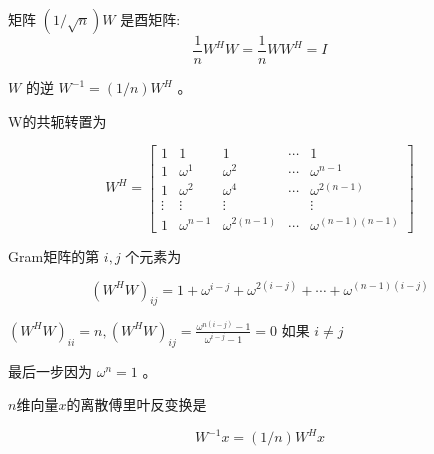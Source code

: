 \begin{corollary}
    矩阵 $ (1 / \sqrt{n}) W $ 是酉矩阵:
$$
\frac{1}{n} W^{H} W=\frac{1}{n} W W^{H}=I
$$
\end{corollary}

\begin{corollary}
    $ W $ 的逆 $ W^{-1}=(1 / n) W^{H} $ 。
\end{corollary}

\begin{corollary}
    W的共轭转置为

    $$ W^{H}=\left[\begin{array}{ccccc}1 & 1 & 1 & \cdots & 1 \\ 1 & \omega^{1} & \omega^{2} & \cdots & \omega^{n-1} \\ 1 & \omega^{2} & \omega^{4} & \cdots & \omega^{2(n-1)} \\ \vdots & \vdots & \vdots & & \vdots \\ 1 & \omega^{n-1} & \omega^{2(n-1)} & \cdots & \omega^{(n-1)(n-1)}\end{array}\right] $$
\end{corollary}

\begin{corollary}
    Gram矩阵的第 $ i, j $ 个元素为

    $$ \left(W^{H} W\right)_{i j}=1+\omega^{i-j}+\omega^{2(i-j)}+\cdots+\omega^{(n-1)(i-j)} $$
    
$ \left(W^{H} W\right)_{i i}=n, \left(W^{H} W\right)_{i j}=\frac{\omega^{n(i-j)}-1}{\omega^{i-j}-1}=0 $ 如果 $ i \neq j $

最后一步因为 $ \omega^{n}=1 $ 。
\end{corollary}

\begin{definition}[离散傅里叶反变换]
    $n$维向量$x$的离散傅里叶反变换是 

    $$ W^{-1} x=(1 / n) W^{H} x $$
\end{definition}